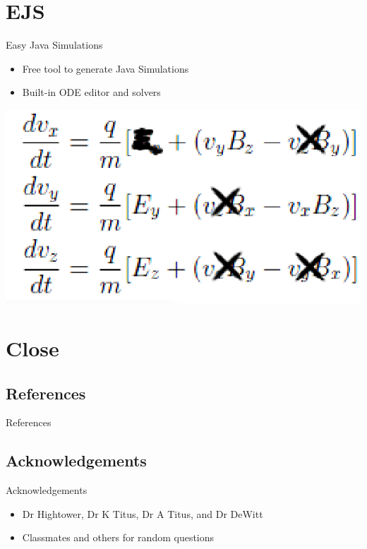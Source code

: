 \documentclass[t,compress,athserif,xcolor=pst,dvips]{beamer}
\begin{document}
	\section{EJS}
	\begin{frame}[c]{Easy Java Simulations}
		\begin{itemize} \itemsep4pt
			\item Free tool to generate Java Simulations
			\item Built-in ODE editor and solvers
		\end{itemize}
		\vspace{.25cm}
		\begin{center}
			\includegraphics[scale=.5]{eqn4_simplied.eps}
		\end{center}
	\end{frame}
		
	\section{Close}

	\subsection{References}
	\begin{frame}[allowframebreaks]{References}
		\footnotesize
		\nocite{*}
		
		
	\end{frame}

	\subsection{Acknowledgements}
	\begin{frame}[c]{Acknowledgements}
		\begin{itemize} \itemsep5pt
			\item Dr Hightower, Dr K Titus, Dr A Titus, and Dr DeWitt
			\item Classmates and others for random questions
		\end{itemize}
	\end{frame}
	
\end{document}
